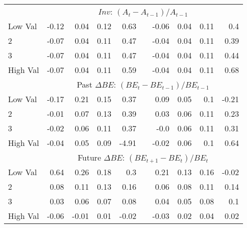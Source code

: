 \begin{tabular}{lrrrrlrrrr}
    & \multicolumn{9}{c}{$Inv$: $(A_t - A_{t-1}) / A_{t-1}$} \\
    Low Val    & -0.12  & 0.04  & 0.12  & 0.63  & & -0.06  & 0.04  & 0.11  & 0.4  \\
           2   & -0.07  & 0.04  & 0.11  & 0.47  & & -0.04  & 0.04  & 0.11  & 0.39  \\
           3   & -0.07  & 0.04  & 0.11  & 0.47  & & -0.04  & 0.04  & 0.11  & 0.44  \\
    High Val   & -0.07  & 0.04  & 0.11  & 0.59  & & -0.04  & 0.04  & 0.11  & 0.68  \\
    [1em]
  

    & \multicolumn{9}{c}{Past $\Delta BE$: $(BE_t - BE_{t-1}) / BE_{t-1}$} \\
    Low Val    & -0.17  & 0.21  & 0.15  & 0.37  & & 0.09  & 0.05  & 0.1  & -0.21  \\
           2   & -0.01  & 0.07  & 0.13  & 0.39  & & 0.03  & 0.06  & 0.11  & 0.23  \\
           3   & -0.02  & 0.06  & 0.11  & 0.37  & & -0.0  & 0.06  & 0.11  & 0.31  \\
    High Val   & -0.04  & 0.05  & 0.09  & -4.91  & & -0.02  & 0.06  & 0.1  & 0.64  \\
    [1em]
  

    & \multicolumn{9}{c}{Future $\Delta BE$: $(BE_{t+1} - BE_t) / BE_t$} \\
    Low Val    & 0.64  & 0.26  & 0.18  & 0.3  & & 0.21  & 0.13  & 0.16  & -0.02  \\
           2   & 0.08  & 0.11  & 0.13  & 0.16  & & 0.06  & 0.08  & 0.11  & 0.14  \\
           3   & 0.03  & 0.06  & 0.07  & 0.08  & & 0.04  & 0.05  & 0.08  & 0.1  \\
    High Val   & -0.06  & -0.01  & 0.01  & -0.02  & & -0.03  & 0.02  & 0.04  & 0.02  \\
    [1em]
  

  \bottomrule
\end{tabular}